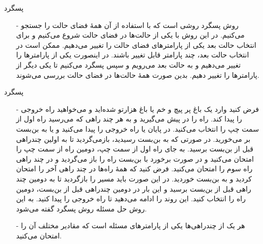 
\begin{frame}{‌پسگرد}
\begin{itemize}\itemr
\item[-]
روش پسگرد
روشی است که با استفاده از آن همهٔ فضای حالت را جستجو می‌کنیم. در این روش با یکی از حالت‌ها در فضای حالت شروع می‌کنیم و برای انتخاب حالت بعد یکی از پارامترهای فضای حالت را تغییر می‌دهیم. ممکن است در انتخاب حالت بعد، چند پارامتر قابل تغییر باشند. در اینصورت یکی از پارامترها را تغییر می‌دهیم و به حالت بعد می‌رویم و سپس پسگرد می‌کنیم تا یکی دیگر از پارامترها را تغییر دهیم. بدین صورت همهٔ حالت‌ها در فضای حالت بررسی می‌شوند.
\end{itemize}
\end{frame}

\iffalse
\begin{frame}{‌پسگرد}
\begin{itemize}\itemr
\item[-]
برای مثال فرض کنید می‌خواهیم همهٔ رشته‌ها با طول ۲ که از سه حرف a و b و c تشکیل شده‌اند را بشماریم. یا به عبارت دیگر همهٔ فضای حالت را تولید کنیم.
\item[-]
با استفاده از روش پسگرد در ابتدا ۳ انتخاب برای حرف اول داریم حرف a را انتخاب می‌کنیم و سپس از بین ۳ انتخاب برای حرف دوم، حرف a را انتخاب می‌کنیم پس رشتهٔ aa را به دست می‌آوریم، سپس پسگرد می‌کنیم و حرف b را برای حرف دوم رشته انتخاب می‌کنیم و رشته ab را بدست می‌آوریم. بار دیگر با یک پسگرد رشتهٔ ac را بدست می‌آوریم. در پسگرد بعدی هیچ انتخابی برای حرف دوم وجود نخواهد داشت پس دوباره پسگرد می‌کنیم و حرف b را به عنوان حرف اول انتخاب می‌کنیم. با استفاده از این روش به ترتیب رشته‌های
ba
،
bb
،
bc
،
ca
،
cb
و
cc
به دست می‌آیند.
\end{itemize}
\end{frame}
\fi

\begin{frame}{‌پسگرد}
\begin{itemize}\itemr
\item[-]
فرض کنید وارد یک باغ پر پیچ و خم یا باغ هزارتو
شده‌اید و می‌خواهید راه خروجی را پیدا کند. راه را در پیش می‌گیرید و به هر چند راهی که می‌رسید راه اول از سمت چپ را انتخاب می‌کنید. در پایان یا راه خروجی را پیدا می‌کنید و یا به بن‌بست بر می‌خورید. در صورتی که به بن‌بست رسیدید، بازمی‌گردید تا به اولین چندراهی قبل از بن‌بست برسید. به جای راه اول از سمت چپ، دومین راه از سمت چپ را امتحان می‌کنید و در صورت برخورد با بن‌بست راه را باز می‌گردید و در چند راهی راه سوم را امتحان می‌کنید. فرض کنید که همهٔ راه‌ها در چند راهی آخر را امتحان کردید و به بن‌بست خوردید. در این صورت باید مسیر را بازگردید تا به دومین چند راهی قبل از بن‌بست برسید و این بار در دومین چندراهی قبل از بن‌بست، دومین راه را انتخاب کنید. این روند را ادامه می‌دهید تا راه خروجی را پیدا کنید. به این روش حل مسئله روش پسگرد گفته می‌شود.
\item[-]
هر یک از چندراهی‌ها یکی از پارامترهای مسئله است که مقادیر مختلف آن را امتحان می‌کنید.
\end{itemize}
\end{frame}


